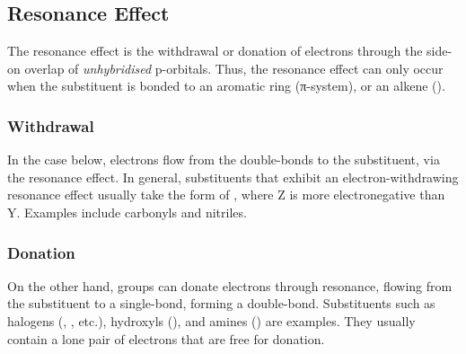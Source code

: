 
\pagebreak
\subsection{Resonance Effect}

	The resonance effect is the withdrawal or donation of electrons through the side-on overlap of \textit{unhybridised} p-orbitals.
	Thus, the resonance effect can only occur when the substituent is bonded to an aromatic ring (π-system), or an alkene ().


	\subsubsection{Withdrawal}

		In the case below, electrons flow from the double-bonds to the substituent, via the resonance effect. In general, substituents
		that exhibit an electron-withdrawing resonance effect usually take the form of , where Z is more electronegative than Y.
		Examples include carbonyls and nitriles.




	\subsubsection{Donation}

		On the other hand, groups can donate electrons through resonance, flowing from the substituent to a single-bond, forming
		a double-bond. Substituents such as halogens (, \ch{\chlorine}, etc.), hydroxyls (), and amines ()
		are examples. They usually contain a lone pair of electrons that are free for donation.


